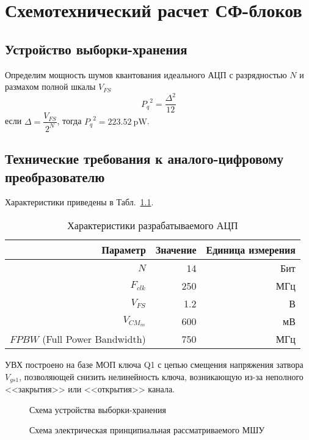 \chapter{Схемотехнический расчет СФ-блоков}

\section{Устройство выборки-хранения}
Определим мощность шумов квантования идеального АЦП с разрядностью \(N\) и размахом полной шкалы \(V_{FS}\)
\[ {P_{q}}^2 = \frac{\Delta^2}{12}\]
если \(\Delta = \dfrac{V_{FS}}{2^N}\), тогда \( {P_q}^2 = 223.52~\mathrm{pW} \).

\section*{Технические требования к аналого-цифровому преобразователю}
Характеристики приведены в Табл.~\ref{tab:Parameters}.
\begin{table}[h]
	\caption[Характеристики разрабатываемого АЦП]{Характеристики разрабатываемого АЦП}
	\label{tab:Parameters}
	\centering
	\begin{tabular}{rrr}
		\toprule
		\textbf{Параметр}      & \textbf{Значение} & \textbf{Единица измерения}\\
		\midrule
		\(N\)                 &   14      & Бит\\
		\(F_{clk}\)           &   250     & МГц\\
		\(V_{FS}\)            &   1.2     & В\\
		\(V_{CM_{in}}\)                   &   600     & мВ\\
		\(FPBW\) (Full Power Bandwidth)   & 750 & МГц\\
		\bottomrule
	\end{tabular}
\end{table}

УВХ построено на базе МОП ключа Q1 с цепью смещения напряжения затвора \(V_{gs1}\), позволяющей снизить нелинейность ключа, возникающую из-за неполного <<закрытия>> или <<открытия>> канала.

\begin{figure}[ht]
	\centering
	
	
	\caption{Схема устройства выборки-хранения}
	\label{ct:bootstrapped_switch}
\end{figure}

\begin{figure}[ht]
	\centering
	
	
	\caption{Схема электрическая принципиальная рассматриваемого МШУ}
	\label{ct:lna_balun_wo_bias}
\end{figure}

